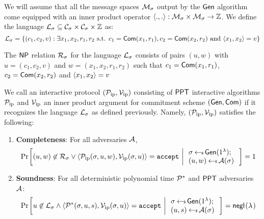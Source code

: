 We will assume that all the message spaces $\mathcal{M}_\sigma$ output by the
$\mathsf{Gen}$ algorithm come equipped with an inner product operator
$\langle .,.\rangle:\mathcal{M}_\sigma\times \mathcal{M}_\sigma\rightarrow \mathbb{Z}$. We define
the language $\mathcal{L}_\sigma\subseteq \mathcal{C}_\sigma\times \mathcal{C}_\sigma\times
\mathbb{Z}$ as:
\begin{equation*}
\mathcal{L}_\sigma = \{(c_1,c_2,v):\exists x_1,x_2,r_1,r_2 \text{ s.t. }
c_1=\mathsf{Com}(x_1,r_1), c_2=\mathsf{Com}(x_2,r_2) \text{ and } \langle x_1,x_2\rangle=v\} 
\end{equation*}

The $\mathsf{NP}$ relation $\mathcal{R}_\sigma$ for the language $\mathcal{L}_\sigma$ consists
of pairs $(u,w)$ with $u=(c_1,c_2,v)$ and $w=(x_1,x_2,r_1,r_2)$ such that
$c_1=\mathsf{Com}(x_1,r_1)$, $c_2=\mathsf{Com}(x_2,r_2)$ and $\langle x_1,x_2\rangle=v$ 

\begin{definition}\label{defn:innerproductarg}
We call an interactive protocol $(\mathcal{P}_\mathrm{ip},\mathcal{V}_\mathrm{ip})$ consisting of $\mathsf{PPT}$ interactive algorithms
$\mathcal{P}_\mathrm{ip}$ and $\mathcal{V}_\mathrm{ip}$ an inner product argument for commitment scheme
$(\mathsf{Gen},\mathsf{Com})$ if it recognizes the language $\mathcal{L}_\sigma$ as defined
previously. Namely, $(\mathcal{P}_\mathrm{ip},\mathcal{V}_\mathrm{ip})$ satisfies the following:
\begin{enumerate}[{\rm (i)}]
\item {\bf Completeness}: For all adversaries $\mathcal{A}$,
\begin{align*}
\condprob{(u,w)\not\in \mc{R}_\sigma \vee \langle \pip(\sigma,u,w),\vip(\sigma,u)\rangle={\tt accept}}{
\begin{array}{l}
\sigma\sample \csetup(\secparam);\\
(u,w)\sample \adv(\sigma)
\end{array}
}=1
\end{align*}

\item{\bf Soundness}: For all deterministic polynomial time $\mathcal{P}^\ast$ and
$\mathsf{PPT}$ adversaries $\mathcal{A}$:
\begin{align*}
\condprob{u\not\in \mc{L}_\sigma \wedge \langle
\mc{P}^\ast(\sigma,u,s),\vip(\sigma,u)\rangle={\tt accept}}{
\begin{array}{l}
\sigma\sample \csetup(\secparam);\\
(u,s)\sample \adv(\sigma)
\end{array}
} = \negl
\end{align*}
\end{enumerate}
\end{definition}

